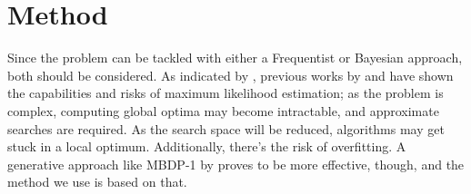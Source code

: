\documentclass[11pt]{article}
\begin{document}
\section{Method}

Since the problem can be tackled with either a Frequentist or Bayesian approach, both should be considered. As indicated by \cite{goldwater2009}, previous works by \cite{venkataraman2001} and \cite{batchelder2001} have shown the capabilities and risks of maximum likelihood estimation; as the problem is complex, computing global optima may become intractable, and approximate searches are required. As the search space will be reduced, algorithms may get stuck in a local optimum. Additionally, there's the risk of overfitting. A generative approach like MBDP-1 by \cite{brent1999} proves to be more effective, though, and the method we use is based on that.
\end{document}
